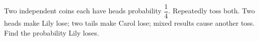 Two independent coins each have heads probability $\dfrac{1}{4}$. Repeatedly toss both. Two heads make Lily lose; two tails make Carol lose; mixed results cause another toss. Find the probability Lily loses.

